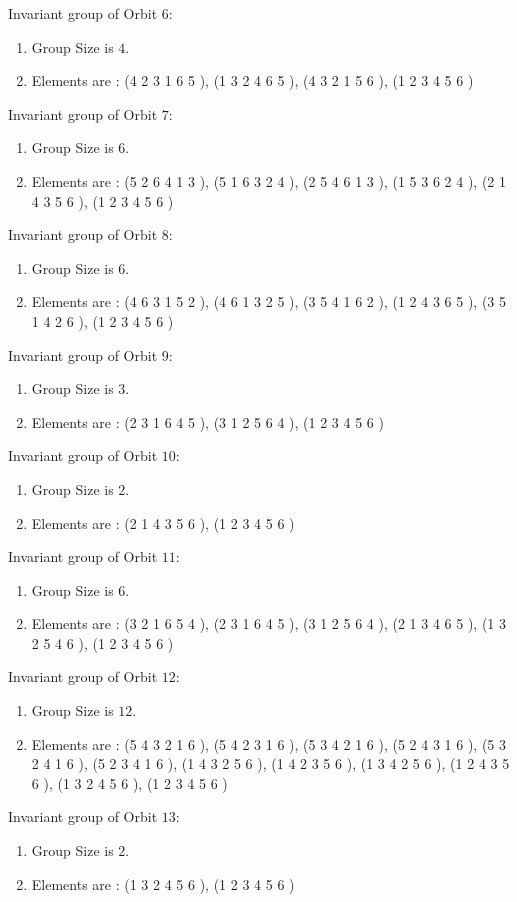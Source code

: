 \documentclass[12pt]{article}
\begin{document}
Invariant group of Orbit $6$:
\begin{enumerate}
\item Group Size is $4$.
\item Elements are : (4 2 3 1 6 5  ), (1 3 2 4 6 5  ), (4 3 2 1 5 6  ), (1 2 3 4 5 6  )
\end{enumerate}
Invariant group of Orbit $7$:
\begin{enumerate}
\item Group Size is $6$.
\item Elements are : (5 2 6 4 1 3  ), (5 1 6 3 2 4  ), (2 5 4 6 1 3  ), (1 5 3 6 2 4  ), (2 1 4 3 5 6  ), (1 2 3 4 5 6  )
\end{enumerate}
Invariant group of Orbit $8$:
\begin{enumerate}
\item Group Size is $6$.
\item Elements are : (4 6 3 1 5 2  ), (4 6 1 3 2 5  ), (3 5 4 1 6 2  ), (1 2 4 3 6 5  ), (3 5 1 4 2 6  ), (1 2 3 4 5 6  )
\end{enumerate}
Invariant group of Orbit $9$:
\begin{enumerate}
\item Group Size is $3$.
\item Elements are : (2 3 1 6 4 5  ), (3 1 2 5 6 4  ), (1 2 3 4 5 6  )
\end{enumerate}
Invariant group of Orbit $10$:
\begin{enumerate}
\item Group Size is $2$.
\item Elements are : (2 1 4 3 5 6  ), (1 2 3 4 5 6  )
\end{enumerate}
Invariant group of Orbit $11$:
\begin{enumerate}
\item Group Size is $6$.
\item Elements are : (3 2 1 6 5 4  ), (2 3 1 6 4 5  ), (3 1 2 5 6 4  ), (2 1 3 4 6 5  ), (1 3 2 5 4 6  ), (1 2 3 4 5 6  )
\end{enumerate}
Invariant group of Orbit $12$:
\begin{enumerate}
\item Group Size is $12$.
\item Elements are : (5 4 3 2 1 6  ), (5 4 2 3 1 6  ), (5 3 4 2 1 6  ), (5 2 4 3 1 6  ), (5 3 2 4 1 6  ), (5 2 3 4 1 6  ), (1 4 3 2 5 6  ), (1 4 2 3 5 6  ), (1 3 4 2 5 6  ), (1 2 4 3 5 6  ), (1 3 2 4 5 6  ), (1 2 3 4 5 6  )
\end{enumerate}
Invariant group of Orbit $13$:
\begin{enumerate}
\item Group Size is $2$.
\item Elements are : (1 3 2 4 5 6  ), (1 2 3 4 5 6  )
\end{enumerate}
\end{document}
